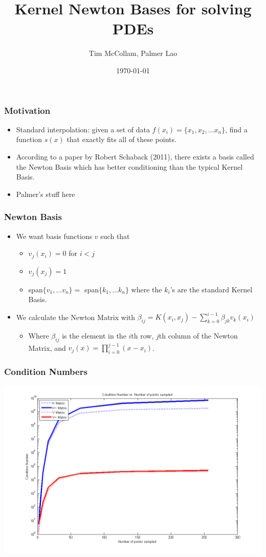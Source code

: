 \documentclass{beamer}
\title[Newton Bases and PDEs]{Kernel Newton Bases for solving PDEs} %
\author{Tim McCollam, Palmer Lao} %
\institute[IIT, CU] %
{
Illinois Institute of Technology, Clarkson University \\ %
\medskip
\textit{tmccolla@hawk.iit.edu, laopa@clarkson.edu} %
}
\date{\today} %
\begin{document}
\begin{frame}
\titlepage %
\end{frame}



\begin{frame}
\frametitle{Motivation}
\begin{itemize}
\item Standard interpolation: given a set of data $f(x_i)=\{x_1, x_2, ... x_n\}$, find a function $s(x)$ that exactly fits all of these points.
\item According to a paper by Robert Schaback (2011), there exists a basis called the Newton Basis which has better conditioning than the typical Kernel Basis.
\item Palmer's stuff here
\end{itemize}
\end{frame}


\begin{frame}
\frametitle{Newton Basis}
\begin{itemize}
\item We want basis functions $v$ such that
	\begin{itemize}
	\item $v_j(x_i)=0$ for $i<j$
	\item $v_j(x_j)=1$
	\item span$\{v_1, ... v_n\}=$ span$\{k_1, ... k_n\}$ where the $k_i$'s are the standard Kernel Basis.
	\end{itemize}
\item We calculate the Newton Matrix with $\beta_{ij}=K(x_i,x_j)-\sum\limits^{i-1}_{k=0}{\beta_{jk}v_{k}(x_i)}$
\begin{itemize}
\item Where $\beta_{ij}$ is the element in the $i$th row, $j$th column of the Newton Matrix,  and $v_j(x) = \prod_{i=0}^{j-1}(x-x_i)$.
\end{itemize}
\end{itemize}
\end{frame}

\begin{frame}
\frametitle{Condition Numbers}
\includegraphics[scale = .45]{condNum}
\end{frame}
\end{document}
